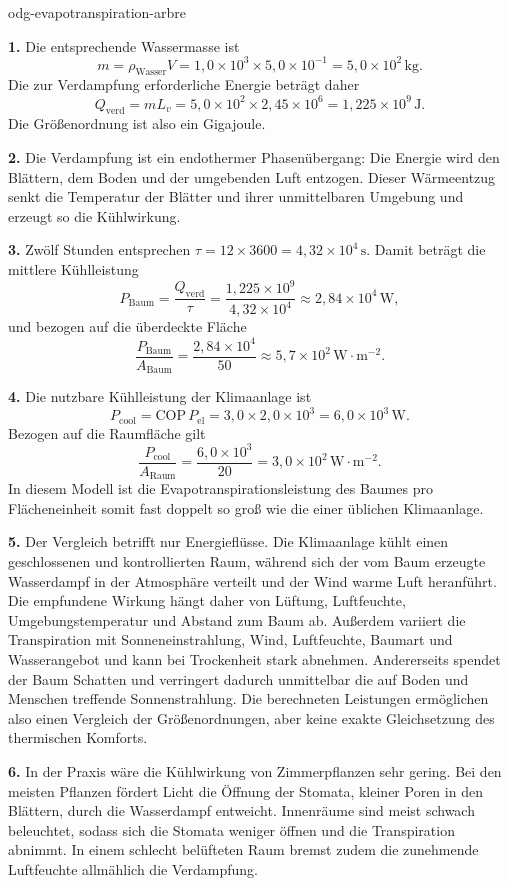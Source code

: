 \begin{exo}{odg-evapotranspiration-arbre}
\begin{solution}
\textbf{1.} Die entsprechende Wassermasse ist
\[
m=\rho_{\text{Wasser}}V
=1{,}0\times10^3\times5{,}0\times10^{-1}
=5{,}0\times10^2\,\text{kg}.
\]
Die zur Verdampfung erforderliche Energie beträgt daher
\[
Q_{\mathrm{verd}}=mL_v
=5{,}0\times10^2\times2{,}45\times10^6
=1{,}225\times10^9\,\text{J}.
\]
Die Größenordnung ist also ein Gigajoule.

\textbf{2.} Die Verdampfung ist ein endothermer Phasenübergang: Die Energie wird den Blättern, dem Boden und der umgebenden Luft entzogen. Dieser Wärmeentzug senkt die Temperatur der Blätter und ihrer unmittelbaren Umgebung und erzeugt so die Kühlwirkung.

\textbf{3.} Zwölf Stunden entsprechen $\tau=12\times3600=4{,}32\times10^4\,\text{s}$. Damit beträgt die mittlere Kühlleistung
\[
P_{\text{Baum}}=\frac{Q_{\mathrm{verd}}}{\tau}
=\frac{1{,}225\times10^9}{4{,}32\times10^4}
\approx2{,}84\times10^4\,\text{W},
\]
und bezogen auf die überdeckte Fläche
\[
\frac{P_{\text{Baum}}}{A_{\text{Baum}}}
=\frac{2{,}84\times10^4}{50}
\approx5{,}7\times10^2\,\text{W}\!\cdot\!\text{m}^{-2}.
\]

\textbf{4.} Die nutzbare Kühlleistung der Klimaanlage ist
\[
P_{\mathrm{cool}}=\mathrm{COP}\,P_{\mathrm{el}}
=3{,}0\times2{,}0\times10^3
=6{,}0\times10^3\,\text{W}.
\]
Bezogen auf die Raumfläche gilt
\[
\frac{P_{\mathrm{cool}}}{A_{\mathrm{Raum}}}
=\frac{6{,}0\times10^3}{20}
=3{,}0\times10^2\,\text{W}\!\cdot\!\text{m}^{-2}.
\]
In diesem Modell ist die Evapotranspirationsleistung des Baumes pro Flächeneinheit somit fast doppelt so groß wie die einer üblichen Klimaanlage.

\textbf{5.} Der Vergleich betrifft nur Energieflüsse. Die Klimaanlage kühlt einen geschlossenen und kontrollierten Raum, während sich der vom Baum erzeugte Wasserdampf in der Atmosphäre verteilt und der Wind warme Luft heranführt. Die empfundene Wirkung hängt daher von Lüftung, Luftfeuchte, Umgebungstemperatur und Abstand zum Baum ab. Außerdem variiert die Transpiration mit Sonneneinstrahlung, Wind, Luftfeuchte, Baumart und Wasserangebot und kann bei Trockenheit stark abnehmen. Andererseits spendet der Baum Schatten und verringert dadurch unmittelbar die auf Boden und Menschen treffende Sonnenstrahlung. Die berechneten Leistungen ermöglichen also einen Vergleich der Größenordnungen, aber keine exakte Gleichsetzung des thermischen Komforts.

\textbf{6.} In der Praxis wäre die Kühlwirkung von Zimmerpflanzen sehr gering. Bei den meisten Pflanzen fördert Licht die Öffnung der Stomata, kleiner Poren in den Blättern, durch die Wasserdampf entweicht. Innenräume sind meist schwach beleuchtet, sodass sich die Stomata weniger öffnen und die Transpiration abnimmt. In einem schlecht belüfteten Raum bremst zudem die zunehmende Luftfeuchte allmählich die Verdampfung.


\end{solution}
\end{exo}
